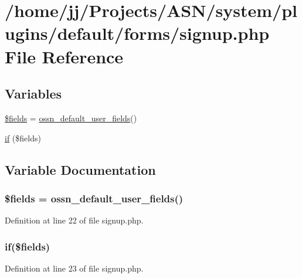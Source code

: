 \hypertarget{signup_8php}{}\section{/home/jj/\+Projects/\+A\+S\+N/system/plugins/default/forms/signup.php File Reference}
\label{signup_8php}
\subsection*{Variables}
\begin{DoxyCompactItemize}
\item 
\hyperlink{signup_8php_ab2303c817e3b402b77b7f99627b9c319}{\$fields} = \hyperlink{ossn_8lib_8users_8php_a17b6a923a5faa7e3c5f6223854557a72}{ossn\+\_\+default\+\_\+user\+\_\+fields}()
\item 
\hyperlink{signup_8php_a2b3754430c8a4072d53bc0fdeff03509}{if} (\$fields)
\end{DoxyCompactItemize}


\subsection{Variable Documentation}
\subsubsection[{\texorpdfstring{\$fields}{$fields}}]{\setlength{\rightskip}{0pt plus 5cm}\$fields = {\bf ossn\+\_\+default\+\_\+user\+\_\+fields}()}\hypertarget{signup_8php_ab2303c817e3b402b77b7f99627b9c319}{}\label{signup_8php_ab2303c817e3b402b77b7f99627b9c319}


Definition at line 22 of file signup.\+php.

\subsubsection[{\texorpdfstring{if}{if}}]{\setlength{\rightskip}{0pt plus 5cm}if(\$fields)}\hypertarget{signup_8php_a2b3754430c8a4072d53bc0fdeff03509}{}\label{signup_8php_a2b3754430c8a4072d53bc0fdeff03509}


Definition at line 23 of file signup.\+php.

